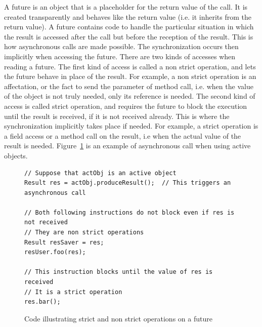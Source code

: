 \documentclass[11pt]{report}
\begin{document}
A future is an object that is a placeholder for the return value of the call. It is created transparently and behaves like the return value (i.e. it inherits from the return value). A future contains code to handle the particular situation in which the result is accessed after the call but before the reception of the result. This is how asynchronous calls are made possible.
The synchronization occurs then implicitly when accessing the future. There are two kinds of accesses when reading a future. The first kind of access is called a non strict operation, and lets the future behave in place of the result. For example, a non strict operation is an affectation, or the fact to send the parameter of method call, i.e. when the value of the object is not truly needed, only its reference is needed. The second kind of access is called strict operation, and requires the future to block the execution until the result is received, if it is not received already. This is where the synchronization implicitly takes place if needed. For example, a strict operation is a field access or a method call on the result, i.e when the actual value of the result is needed.
Figure~\ref{fig:strict_operation} is an example of asynchronous call when using active objects.

\begin{figure}[!ht]
	\lstset{language=java, numbers=left, numberstyle=\tiny, stepnumber=1, numbersep=5pt, basicstyle=\footnotesize}
	\begin{lstlisting}[frame=single]
// Suppose that actObj is an active object
Result res = actObj.produceResult();  // This triggers an asynchronous call

// Both following instructions do not block even if res is not received
// They are non strict operations
Result resSaver = res;
resUser.foo(res);

// This instruction blocks until the value of res is received 
// It is a strict operation
res.bar();
 	\end{lstlisting}
\caption{Code illustrating strict and non strict operations on a future}
\label{fig:strict_operation}
\end{figure}
\end{document}
